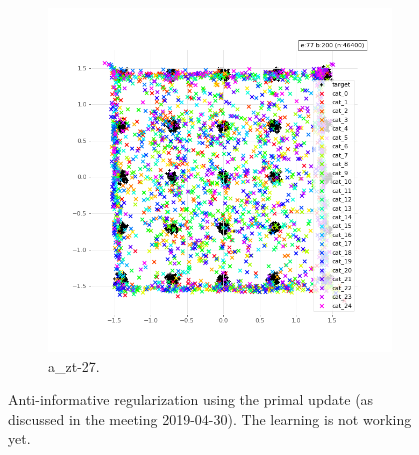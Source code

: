 \begin{figure}[!htbp]
   \centering
\begin{subfigure}[t]{0.48\textwidth}
   \includegraphics[width=\textwidth,center]{2019-05-07/reg-w-primal/a_zt-27.png}
   \caption{a_zt-27.}
   \label{fig:2019-05-07_reg-w-primal-a}
\end{subfigure}
   \caption{Anti-informative regularization using the primal update (as discussed in the meeting 2019-04-30). The learning is not working yet.}
   \label{fig:2019-05-07_reg-w-primal}
\end{figure}